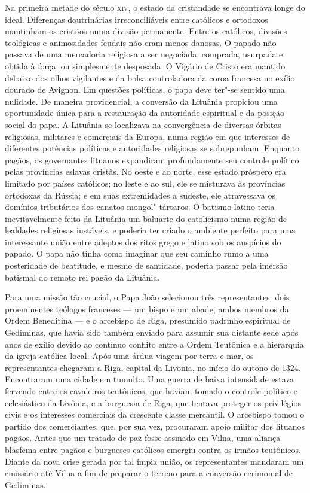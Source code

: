 Na primeira metade do século \textsc{xiv}, o estado da cristandade se encontrava
longe do ideal. Diferenças doutrinárias irreconciliáveis entre católicos
e ortodoxos mantinham os cristãos numa divisão permanente. Entre os
católicos, divisões teológicas e animosidades feudais não eram menos
danosas. O papado não passava de uma mercadoria religiosa a ser
negociada, comprada, usurpada e obtida à força, ou simplesmente
desposada. O Vigário de Cristo era mantido debaixo dos olhos vigilantes
e da bolsa controladora da coroa francesa no exílio dourado de Avignon.
Em questões políticas, o papa deve ter"-se sentido uma nulidade. De
maneira providencial, a conversão da Lituânia propiciou uma oportunidade
única para a restauração da autoridade espiritual e da posição social do
papa. A Lituânia se localizava na convergência de diversas órbitas
religiosas, militares e comerciais da Europa, numa região em que
interesses de diferentes potências políticas e autoridades religiosas se
sobrepunham. Enquanto pagãos, os governantes lituanos expandiram
profundamente seu controle político pelas províncias eslavas cristãs. No
oeste e ao norte, esse estado próspero era limitado por países
católicos; no leste e ao sul, ele se misturava às províncias ortodoxas
da Rússia; e em suas extremidades a sudeste, ele atravessava os domínios
tributários dos canatos mongol"-tártaros. O batismo latino teria
inevitavelmente feito da Lituânia um baluarte do catolicismo numa região
de lealdades religiosas instáveis, e poderia ter criado o ambiente
perfeito para uma interessante união entre adeptos dos ritos grego e
latino sob os auspícios do papado. O papa não tinha como imaginar que
seu caminho rumo a uma posteridade de beatitude, e mesmo de santidade,
poderia passar pela imersão batismal do remoto rei pagão da Lituânia.

%

Para uma missão tão crucial, o Papa João  selecionou três
representantes: dois proeminentes teólogos franceses --- um bispo e um
abade, ambos membros da Ordem Beneditina --- e o arcebispo de Riga,
presumido padrinho espiritual de Gediminas, que havia sido também
enviado para assumir sua distante sede após anos de exílio devido ao
contínuo conflito entre a Ordem Teutônica e a hierarquia da igreja
católica local. Após uma árdua viagem por terra e mar, os representantes
chegaram a Riga, capital da Livônia, no início do outono de 1324.
Encontraram uma cidade em tumulto. Uma guerra de baixa intensidade
estava fervendo entre os cavaleiros teutônicos, que haviam tomado o
controle político e eclesiástico da Livônia, e a burguesia de Riga, que
tentava proteger os privilégios civis e os interesses comerciais da
crescente classe mercantil. O arcebispo tomou o partido dos
comerciantes, que, por sua vez, procuraram apoio militar dos lituanos
pagãos. Antes que um tratado de paz fosse assinado em Vilna, uma aliança
blasfema entre pagãos e burgueses católicos emergiu contra os irmãos
teutônicos. Diante da nova crise gerada por tal ímpia união, os
representantes mandaram um emissário até Vilna a fim de preparar o
terreno para a conversão cerimonial de Gediminas.

